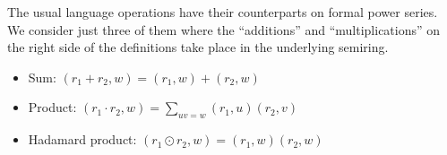 The usual language operations have their counterparts on formal power
series. We consider just three of them where the ``additions'' and ``multiplications'' on the
right side of the definitions take place in the underlying semiring.
\begin{itemize}
\item Sum: $(r_1 + r_2, w) = (r_1, w) + (r_2, w)$ 
\item Product: $(r_1 \cdot r_2, w) = \sum_{uv=w} (r_1, u) (r_2,v)$
\item Hadamard product: $(r_1 \odot r_2, w) = (r_1, w) (r_2, w)$
\end{itemize}


\clearpage{}
